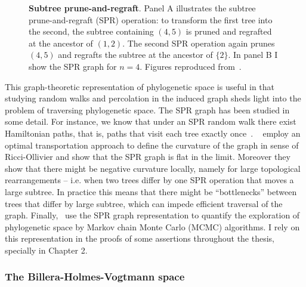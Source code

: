 \begin{figure}[!ht]
  \begin{center}
  \end{center}
\caption{\textbf{Subtree prune-and-regraft}.
Panel A  illustrates the subtree prune-and-regraft (SPR) operation: to transform the first tree into the second, the subtree containing $(4,5)$ is pruned and regrafted at the ancestor of $(1,2)$.
The second SPR operation again prunes $(4,5)$ and regrafts the subtree at the ancestor of $\{2\}$.
In panel B I show the SPR graph for $n=4$.
Figures reproduced from~\cite{Whidden2017}.
}
\label{fig:spr}
\end{figure}

This graph-theoretic representation of phylogenetic space is useful in that studying random walks and percolation in the induced graph sheds light into the problem of traversing phylogenetic space.
The SPR graph has been studied in some detail.
For instance, we know that under an SPR random walk there exist Hamiltonian paths, that is, paths that visit each tree exactly once~\citep{Caceres2011}.
~\cite{Whidden2017} employ an optimal transportation approach to define the curvature of the graph in sense of Ricci-Ollivier and show that the SPR graph is flat in the limit.
Moreover they show that there might be negative curvature locally, namely for large topological rearrangements -- i.e. when two trees differ by one SPR operation that moves a large subtree.
In practice this means that there might be ``bottlenecks'' between trees that differ by large subtree, which can impede efficient traversal of the graph.
Finally,~\cite{Whidden2015} use the SPR graph representation to quantify the exploration of phylogenetic space by Markov chain Monte Carlo (MCMC) algorithms.
I rely on this representation in the proofs of some assertions throughout the thesis, specially in Chapter 2.

\subsubsection{The Billera-Holmes-Vogtmann space}


